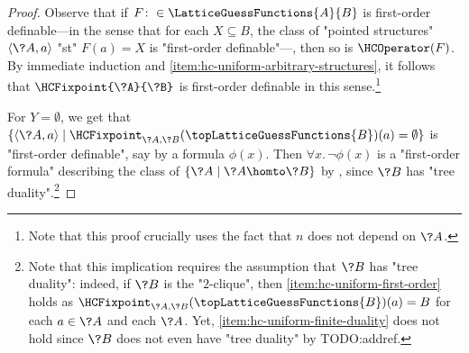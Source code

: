\begin{proof}
	Observe that if $F\colon \in \LatticeGuessFunctions{A}{B}$ is first-order
	definable---in the sense that for each $X \subseteq B$, the class of "pointed structures"
	$\langle \?A, a\rangle$ "st" $F(a) = X$ is "first-order definable"---, then so is
	$\HCOperator(F)$. By immediate induction and \eqref{item:hc-uniform-arbitrary-structures},
	it follows that $\HCFixpoint{\?A}{\?B}$ is first-order definable in this sense.\footnote{Note 
	that this proof crucially uses the fact that $n$ does not depend on $\?A$.}

	For $Y = \emptyset$, we get that $\{\langle \?A, a \rangle \mid \HCFixpoint_{\?A,\?B}(\topLatticeGuessFunctions{B})(a) = \emptyset\}$ is "first-order definable", say by a formula
	$\phi(x)$. Then $\forall x.\, \neg \phi(x)$ is a "first-order formula" describing the class of
	$\{\?A \mid \?A \homto \?B\}$ by , since
	$\?B$ has "tree duality".\footnote{Note that this implication requires the assumption that
	$\?B$ has "tree duality": indeed, if $\?B$ is the "$2$-clique", then \eqref{item:hc-uniform-first-order} holds as $\HCFixpoint_{\?A,\?B}(\topLatticeGuessFunctions{B})(a) = B$ for each $a\in \?A$ and each $\?A$. Yet, \eqref{item:hc-uniform-finite-duality} does not hold since $\?B$ does not even have "tree duality" by TODO:addref.} 


\end{proof}
